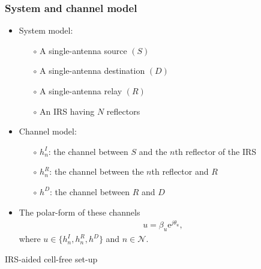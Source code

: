 \documentclass[article,mathserif,10pt,envcountsect]{beamer}
\renewcommand{\exp}[1]{\mathrm{e}^{#1}}
\begin{document}
\begin{frame}
\frametitle{System and channel model}
\hspace{-0.6cm}
\begin{minipage}[t]{0.5\linewidth}
	\begin{itemize}
		\item {\color{TUM_blau}System model:}
		\begin{itemize}
			\item[$\circ$] A single-antenna source $(S)$
			\item[$\circ$] A single-antenna destination $(D)$
			\item[$\circ$] A single-antenna relay $(R)$
			\item[$\circ$] An IRS having $N$ reflectors
		\end{itemize}
	
		\item {\color{TUM_blau}Channel model:}
		\begin{itemize}
			\item[$\circ$] \alert{$h_n^I$}: the channel between $S$ and the $n$th reflector  of the IRS
			\item[$\circ$] \alert{$h_n^R$}: the channel between the $n$th reflector  and $R$
			\item[$\circ$] \alert{$h^D\!$}: the channel between $\!R\!$ and $\!D$
		\end{itemize}
	
		\item The polar-form of these channels 
		\begin{eqnarray}\label{eqn:dirct_chnl}
		u = \beta_u \exp{j\theta_{u}}, \nonumber
		\end{eqnarray}
		where $u \in\{h_{n}^I, h_{n}^R, h^D\}$ and $n \in{\mathcal{N}}$.	
		
	\end{itemize}

\end{minipage}\hspace{0.05cm}
\begin{minipage}[t]{0.5\linewidth}		
	\vspace{-2.0em}
	\begin{block}{IRS-aided cell-free set-up}
		\begin{figure}
			\def\svgwidth{170pt}
			\fontsize{6}{5}\selectfont
			 
		\end{figure}
	\end{block}
	

\end{minipage}
\end{frame}
\end{document}
